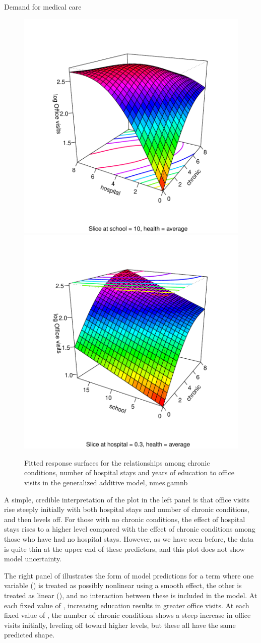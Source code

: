 \documentclass[11pt]{book}\usepackage[]{graphicx}\usepackage[]{color}
\newenvironment{knitrout}{}{} %
\renewenvironment{knitrout}{\small\renewcommand{\baselinestretch}{.85}}{} %
\begin{document}
\begin{Example}[nmes3]{Demand for medical care}
\begin{knitrout}
\begin{figure}[!htbp]
\centerline{\includegraphics[width=.5\textwidth]{ch09/fig/nmes3-rsm-1} 
\includegraphics[width=.5\textwidth]{ch09/fig/nmes3-rsm-2} }

\caption[Fitted response surfaces for the relationships among chronic conditions,  number of hospital stays and years of education to office visits in the generalized additive model, nmes]{Fitted response surfaces for the relationships among chronic conditions,  number of hospital stays and years of education to office visits in the generalized additive model, nmes.gamnb\label{fig:nmes3-rsm}}
\end{figure}


\end{knitrout}
A simple, credible interpretation of the plot in the left panel is
that office visits rise steeply initially with both hospital stays and number of chronic conditions, and then
levels off. For those with no chronic conditions, the effect of hospital stays rises to a higher level
compared with the effect of chronic conditions among those who have had no hospital stays.
However, as we have seen before, the data is quite thin at the upper end of these
predictors, and this plot does not show model uncertainty.

The right panel of  illustrates the form of model predictions for a term
where one variable () is treated as possibly nonlinear using a smooth 
effect, the other is treated as linear (), and no interaction between these is
included in the model.  At each fixed value of , increasing education results in
greater office visits.  At each fixed value of , the number of chronic conditions shows
a steep increase in office visits initially, leveling off toward higher levels, but these all have
the same predicted shape.


\end{Example}
\end{document}
